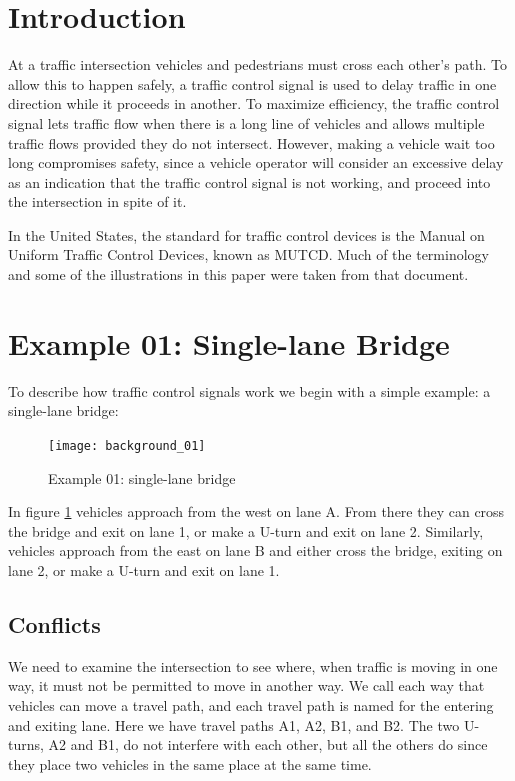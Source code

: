 \documentclass[letterpaper,twoside]{article}
\begin{document}
\section{Introduction}
At a traffic intersection vehicles and pedestrians must cross each other's
path.  To allow this to happen safely, a traffic control signal is used to
delay traffic in one direction while it proceeds in another.  To maximize
efficiency, the traffic control signal lets traffic flow when there is a
long line of vehicles and allows multiple traffic flows provided they
do not intersect.  However, making a vehicle wait too long compromises safety,
since a vehicle operator will consider an excessive  delay as an indication
that the traffic control signal is not working, and proceed into the
intersection in spite of it.

In the United States, the standard for traffic control devices is the
Manual on Uniform Traffic Control Devices, known as MUTCD\citep{MUTCD11}.
Much of the terminology and some of the illustrations
in this paper were taken from that document.

\section{Example 01: Single-lane Bridge}

To describe how traffic control signals work we begin with a simple
example: a single-lane bridge:

\begin{figure}[htb]
  {\texttt{[image: background\_01]}}
  {\caption{Example 01: single-lane bridge}\label{fig:single-lane_bridge}}
\end{figure}

In figure \ref{fig:single-lane_bridge} vehicles approach from the west
on lane A.  From there they can cross the bridge and exit on lane 1,
or make a U-turn and exit on lane 2.  Similarly, vehicles approach
from the east on lane B and either cross the bridge, exiting on lane 2,
or make a U-turn and exit on lane 1.

\subsection{Conflicts}

We need to examine the intersection to see where, when traffic is moving
in one way, it must not be permitted to move in another way.  We call each
way that vehicles can move a travel path, and each travel path is named
for the entering and exiting lane.  Here we have travel paths A1, A2, B1,
and B2.  The two U-turns, A2 and B1, do not interfere with each other, but
all the others do since they place two vehicles in the same place at the
same time.
\end{document}
